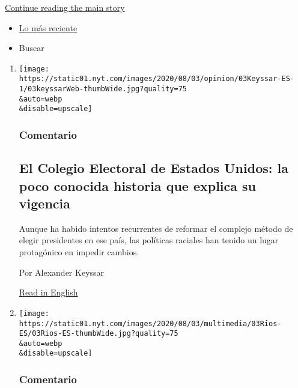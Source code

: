 \protect\hyperlink{after-mid1}{Continue reading the main story}

\begin{itemize}
\tightlist
\item
  \protect\hyperlink{stream-panel}{Lo más reciente}
\item
  Buscar
\end{itemize}

\begin{enumerate}
\def\labelenumi{\arabic{enumi}.}
\item
  \href{/es/2020/08/03/espanol/opinion/colegio-electoral-estados-unidos.html}{}

  \texttt{[image: https://static01.nyt.com/images/2020/08/03/opinion/03Keyssar-ES-1/03keyssarWeb-thumbWide.jpg?quality=75\\\&auto=webp\\\&disable=upscale]}

  \hypertarget{comentario-4}{%
  \subsubsection{Comentario}\label{comentario-4}}

  \hypertarget{el-colegio-electoral-de-estados-unidos-la-poco-conocida-historia-que-explica-su-vigencia}{%
  \subsection{El Colegio Electoral de Estados Unidos: la poco conocida
  historia que explica su
  vigencia}\label{el-colegio-electoral-de-estados-unidos-la-poco-conocida-historia-que-explica-su-vigencia}}

  Aunque ha habido intentos recurrentes de reformar el complejo método
  de elegir presidentes en ese país, las políticas raciales han tenido
  un lugar protagónico en impedir cambios.

  Por Alexander Keyssar

  \href{https://www.nytimes.com/2020/08/03/opinion/electoral-college-racism-white-supremacy.html}{Read
  in English}
\item
  \href{/es/2020/08/03/espanol/opinion/servicio-salud-mexico.html}{}

  \texttt{[image: https://static01.nyt.com/images/2020/08/03/multimedia/03Rios-ES/03Rios-ES-thumbWide.jpg?quality=75\\\&auto=webp\\\&disable=upscale]}

  \hypertarget{comentario-5}{%
  \subsubsection{Comentario}\label{comentario-5}}


\end{enumerate}
